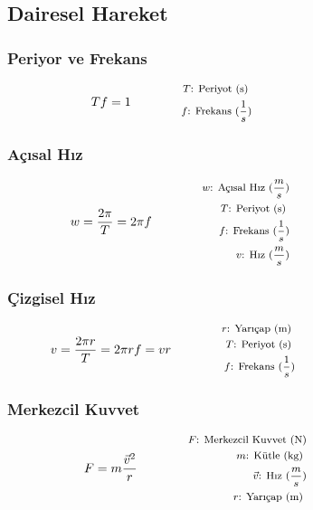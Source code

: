 \subsection{Dairesel Hareket}

\subsubsection*{Periyor ve Frekans}
\begin{equation}
    Tf = 1 \qquad \qquad \parbox{5.5cm}{\footnotesize$\begin{aligned}
        T\text{: Periyot (s) } \\
        f\text{: Frekans } (\frac{1}{s})
\end{aligned}$}
\end{equation}

\subsubsection*{Açısal Hız}
\begin{equation}
    w  = \frac{2\pi}{T} = 2 \pi f \qquad \qquad \parbox{5.5cm}{\footnotesize$\begin{aligned}
        w\text{: Açısal Hız } (\frac{m}{s}) \\
        T\text{: Periyot (s) } \\
        f\text{: Frekans } (\frac{1}{s}) \\
        v\text{: Hız } (\frac{m}{s})
\end{aligned}$}
\end{equation}

\subsubsection*{Çizgisel Hız}
\begin{equation}
    v = \frac{2 \pi r}{T} = 2 \pi r f = v r  \qquad \qquad \parbox{5.5cm}{\footnotesize$\begin{aligned}
        r\text{: Yarıçap (m) } \\
        T\text{: Periyot (s) } \\
        f\text{: Frekans } (\frac{1}{s})
\end{aligned}$}
\end{equation}

\subsubsection*{Merkezcil Kuvvet}
\begin{equation}
    F = m \frac{\vec{v}^2}{r} \qquad \qquad \parbox{5.5cm}{\footnotesize$\begin{aligned}
        F\text{: Merkezcil Kuvvet (N)} \\
        m\text{: Kütle (kg) } \\
        \vec{v}\text{: Hız } (\frac{m}{s}) \\
        r\text{: Yarıçap (m) }
\end{aligned}$}
\end{equation}

